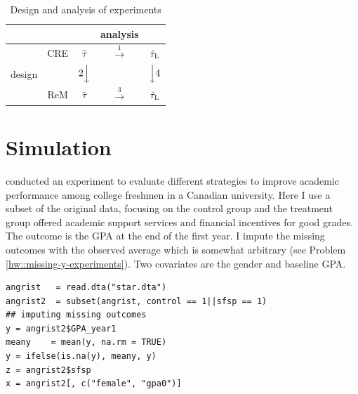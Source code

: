 \begin{table}
\centering
\caption{Design and analysis of experiments}\label{tb::design-analysis-2x2}
\label{tb::rerandomization-regression}
\begin{tabular}{c|cccc}
\hline 
  & & & analysis & \\
  \hline 
  & CRE & $\hat\tau$ \citep{Neyman:1923} &  $\stackrel{1}{\longrightarrow}$  &  $\hat\tau_\textsc{L}$ \citep{lin2013} \\
  design&  &  $2\Big\downarrow$ && $  \Big\downarrow 4$ \\
  & ReM & $\hat\tau$  \citep{li2018asymptotic} &  $\stackrel{3}{\longrightarrow}$  &$\hat\tau_\textsc{L}$ \citep{li2019rerandomization}  \\
  \hline 
\end{tabular}
\end{table}



 

\section{Simulation}
\label{sec::rem-reg-simulation}

\citet{angrist2009incentives}  conducted an experiment to evaluate different strategies to improve academic performance among college freshmen in a Canadian university. Here I use a subset of the original data, focusing on the control group and the treatment group offered academic support services and financial incentives for good grades. The outcome is the GPA at the end of the first year. I impute the missing outcomes with the observed average which is somewhat arbitrary (see Problem \ref{hw::missing-y-experiments}). Two covariates are the gender and baseline GPA.

\begin{lstlisting}
angrist   = read.dta("star.dta")
angrist2  = subset(angrist, control == 1||sfsp == 1)
## imputing missing outcomes
y = angrist2$GPA_year1
meany    = mean(y, na.rm = TRUE)
y = ifelse(is.na(y), meany, y)
z = angrist2$sfsp 
x = angrist2[, c("female", "gpa0")]
\end{lstlisting}


